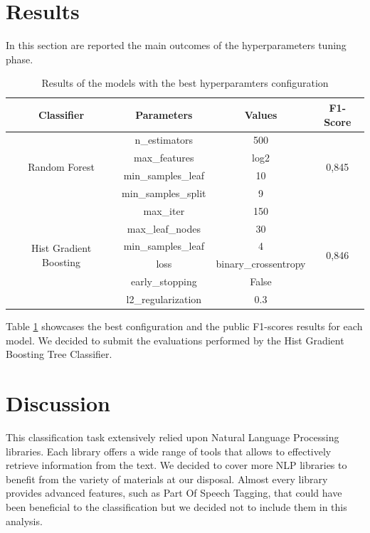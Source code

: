 \documentclass[conference]{IEEEtran}
\begin{document}
\section{Results}\label{sec:results}
In this section are reported the main outcomes of the hyperparameters tuning phase.
\begin{table}[h]
\begin{tabular}{@{}cccc@{}}
\toprule
\textbf{Classifier}                          & \textbf{Parameters} & \textbf{Values} & \textbf{F1-Score}      \\ \midrule
\multirow{4}{*}{Random Forest}               & n\_estimators       & 500             & \multirow{4}{*}{0,845} \\
                                             & max\_features       & log2            &                        \\
                                             & min\_samples\_leaf  & 10              &                        \\
                                             & min\_samples\_split & 9               &                        \\ \midrule
\multirow{6}{*}{Hist Gradient Boosting} & max\_iter           & 150             & \multirow{6}{*}{0,846} \\
                                             & max\_leaf\_nodes    & 30              &                        \\
                                             & min\_samples\_leaf  & 4               &                        \\
                                             & loss                & binary\_crossentropy &                        \\
                                             & early\_stopping     & False           &                        \\
                                             & l2\_regularization  & 0.3             &                        \\ \bottomrule
\end{tabular}
\caption{Results of the models with the best hyperparamters configuration}
\label{tab:results}
\end{table}
Table \ref{tab:results} showcases the best configuration and the public F1-scores results for each model.
We decided to submit the evaluations performed by the Hist Gradient Boosting Tree Classifier.
\section{Discussion}\label{sec:discussion}
This classification task extensively relied upon Natural Language Processing libraries. Each library offers a wide range of tools that allows to effectively retrieve information from the text. We decided to cover more NLP libraries to benefit from the variety of materials at our disposal. Almost every library provides advanced features, such as Part Of Speech Tagging, that could have been beneficial to the classification but we decided not to include them in this analysis. 
\end{document}
